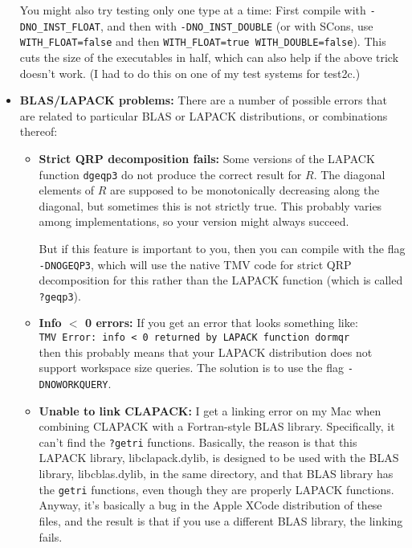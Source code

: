 \documentclass[twoside,letterpaper,11pt]{article}
\renewcommand{\tt}[1]{{\lstinline {#1}}}
\begin{document}
\begin{itemize}
You might also try testing only one type at a time: First compile with \texttt{-DNO\_INST\_FLOAT},
and then with \texttt{-DNO\_INST\_DOUBLE} (or with SCons, use \texttt{WITH\_FLOAT=false}
and then \texttt{WITH\_FLOAT=true WITH\_DOUBLE=false}).  This cuts the size of the executables
in half, which can also help if the above trick doesn't work.  (I had to do this on one 
of my test systems for test2c.)


\item{\bf BLAS/LAPACK problems:}
There are a number of possible errors that are related to particular BLAS or LAPACK
distributions, or combinations thereof:
\begin{itemize}
\item{\bf Strict QRP decomposition fails:}
Some versions of the LAPACK function \tt{dgeqp3} do not produce the correct
result for $R$.  The diagonal elements of $R$ are supposed to be monotonically decreasing
along the diagonal, but sometimes this is not strictly true.  This probably varies among
implementations, so your version might always succeed.

But if this feature is important to you, then you can compile with the flag \texttt{-DNOGEQP3},
which will use the native TMV code for strict QRP decomposition for this 
rather than the LAPACK function (which is called \tt{?geqp3}).

\item{\bf Info $<$ 0 errors:}
If you get an error that looks something like:\\
\texttt{TMV Error: info < 0 returned by LAPACK function dormqr}\\
then this probably means that your LAPACK distribution does not support
workspace size queries.  The solution is to use the flag \texttt{-DNOWORKQUERY}.

\item {\bf Unable to link CLAPACK:}
I get a linking error on my Mac when combining CLAPACK with a Fortran-style BLAS library.
Specifically, it can't find the \texttt{?getri} functions.   Basically, the reason is that
this LAPACK library, libclapack.dylib, is designed to be used with the BLAS
library, libcblas.dylib, in the same directory, and that BLAS library has the \texttt{getri}
functions, even though they are properly LAPACK functions.
Anyway, it's basically a bug in the Apple XCode distribution of these files,
and the result is that if you use a different BLAS library, the linking fails.


\end{itemize}
\end{itemize}
\end{document}
